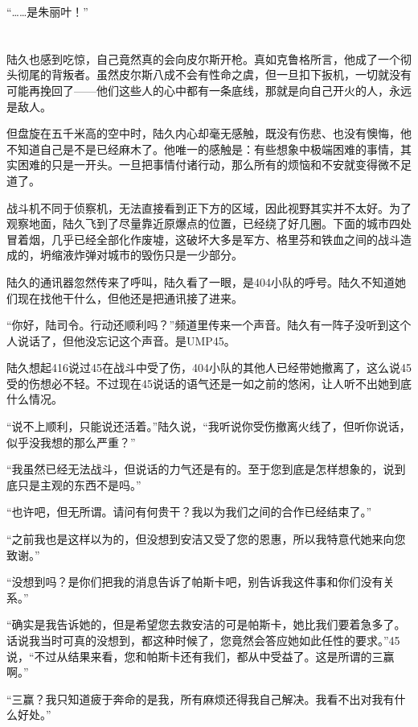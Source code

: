 “……是朱丽叶！”

\section*{}

陆久也感到吃惊，自己竟然真的会向皮尔斯开枪。真如克鲁格所言，他成了一个彻头彻尾的背叛者。虽然皮尔斯八成不会有性命之虞，但一旦扣下扳机，一切就没有可能再挽回了——他们这些人的心中都有一条底线，那就是向自己开火的人，永远是敌人。

但盘旋在五千米高的空中时，陆久内心却毫无感触，既没有伤悲、也没有懊悔，他不知道自己是不是已经麻木了。他唯一的感触是：有些想象中极端困难的事情，其实困难的只是一开头。一旦把事情付诸行动，那么所有的烦恼和不安就变得微不足道了。

战斗机不同于侦察机，无法直接看到正下方的区域，因此视野其实并不太好。为了观察地面，陆久飞到了尽量靠近原爆点的位置，已经绕了好几圈。下面的城市四处冒着烟，几乎已经全部化作废墟，这破坏大多是军方、格里芬和铁血之间的战斗造成的，坍缩液炸弹对城市的毁伤只是一少部分。

陆久的通讯器忽然传来了呼叫，陆久看了一眼，是404小队的呼号。陆久不知道她们现在找他干什么，但他还是把通讯接了进来。

“你好，陆司令。行动还顺利吗？”频道里传来一个声音。陆久有一阵子没听到这个人说话了，但他没忘记这个声音。是UMP45。

陆久想起416说过45在战斗中受了伤，404小队的其他人已经带她撤离了，这么说45受的伤想必不轻。不过现在45说话的语气还是一如之前的悠闲，让人听不出她到底什么情况。

“说不上顺利，只能说还活着。”陆久说，“我听说你受伤撤离火线了，但听你说话，似乎没我想的那么严重？”

“我虽然已经无法战斗，但说话的力气还是有的。至于您到底是怎样想象的，说到底只是主观的东西不是吗。”

“也许吧，但无所谓。请问有何贵干？我以为我们之间的合作已经结束了。”

“之前我也是这样以为的，但没想到安洁又受了您的恩惠，所以我特意代她来向您致谢。”

“没想到吗？是你们把我的消息告诉了帕斯卡吧，别告诉我这件事和你们没有关系。”

“确实是我告诉她的，但是希望您去救安洁的可是帕斯卡，她比我们要着急多了。话说我当时可真的没想到，都这种时候了，您竟然会答应她如此任性的要求。”45说，“不过从结果来看，您和帕斯卡还有我们，都从中受益了。这是所谓的三赢啊。”

“三赢？我只知道疲于奔命的是我，所有麻烦还得我自己解决。我看不出对我有什么好处。”

